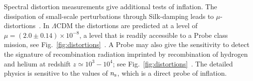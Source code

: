 Spectral distortion measurements give additional tests of inflation. The dissipation of small-scale 
perturbations through Silk-damping leads to $\mu$-distortions~\cite{Sunyaev1970diss, Daly1991, Hu1994, Chluba2012}. 
In $\Lambda$CDM the distortions are predicted at a level of $\mu=(2.0\pm0.14)\times 10^{-8}$, a level that 
is readily accessible to a Probe class mission, see Fig.~\ref{fig:distortions}~\cite{Chluba2012, Chluba2016LCDM}. 
A Probe may also give the sensitivity to detect the signature of recombination 
radiation imprinted by recombination of hydrogen and helium 
at redshift $z\simeq 10^3-10^4$; see Fig.~\ref{fig:distortions}~\citep{Sunyaev2009, Chluba2016}. 
The detailed physics is sensitive to the values of $n_{\rm s}$, which is a direct probe of inflation. 




